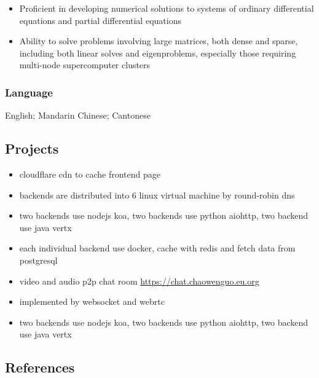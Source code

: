 \documentclass[
]{article}
\providecommand{\tightlist}{%
  \setlength{\itemsep}{0pt}\setlength{\parskip}{0pt}}
\begin{document}
\begin{itemize}
\tightlist
\item
  Proficient in developing numerical solutions to systems of ordinary
  differential equations and partial differential equations
\item
  Ability to solve problems involving large matrices, both dense and
  sparse, including both linear solves and eigenproblems, especially
  those requiring multi-node supercomputer clusters
\end{itemize}

\hypertarget{language}{%
\subsubsection{Language}\label{language}}

English; Mandarin Chinese; Cantonese

\hypertarget{projects}{%
\subsection{Projects}\label{projects}}

\begin{itemize}
\tightlist
\item
  cloudflare cdn to cache frontend page
\item
  backends are distributed into 6 linux virtual machine by round-robin
  dns
\item
  two backends use nodejs koa, two backends use python aiohttp, two
  backend use java vertx
\item
  each individual backend use docker, cache with redis and fetch data
  from postgresql
\end{itemize}

\begin{itemize}
\tightlist
\item
  video and audio p2p chat room \url{https://chat.chaowenguo.eu.org}
\item
  implemented by websocket and webrtc
\item
  two backends use nodejs koa, two backends use python aiohttp, two
  backend use java vertx
\end{itemize}

\hypertarget{references}{%
\subsection{References}\label{references}}
\end{document}
